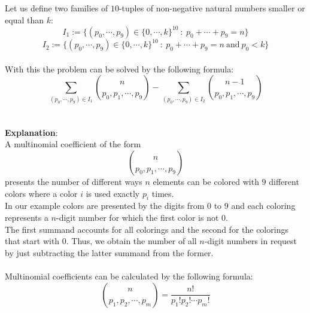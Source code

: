 \documentclass[17pt]{extarticle}
\begin{document}
	Let us define two families of $10$-tuples of non-negative natural numbers smaller or equal than $k$:\\
$$I_1:=\{(p_0, \cdots, p_9)\in \{0,\cdots, k\}^{10} \ : \ p_0 + \cdots + p_9 = n \}$$
$$I_2:=\{(p_0, \cdots, p_9)\in \{0,\cdots, k\}^{10} \ : \ p_0 + \cdots + p_9 = n \ \text{and} \ p_0< k\}$$
\\
With this the problem can be solved by the following formula:
$$	\sum_{(p_0, \cdots, p_9)\in I_1}
		\binom{n}{p_0,p_1, \cdots, p_9} 
		- 	\sum_{(p_0, \cdots, p_9)\in I_2}
		\binom{n-1}{p_0, p_1, \cdots, p_9} 
$$
\\ \\
\textbf{Explanation}:\\
A multinomial coefficient of the form
$$\binom{n}{p_0,p_1, \cdots, p_9} $$
presents the number of different ways $n$ elements can be colored with $9$ different colors
where a color $i$ is used exactly $p_i$ times.\\
In our example colors are presented by the digits from $0$ to $9$ and each coloring represents a 
$n$-digit number for which the first color is not $0$.\\
The first summand accounts for all colorings and the second for the colorings that start with $0$.
Thus, we obtain the number of all $n$-digit numbers in request by just subtracting the latter summand from the former.\\ \\
Multinomial coefficients can be calculated by the following formula:
$$\binom{n}{p_1,p_2, \cdots, p_m} =\frac{n!}{p_1! p_2! \cdots p_m!}$$\\
\end{document}
